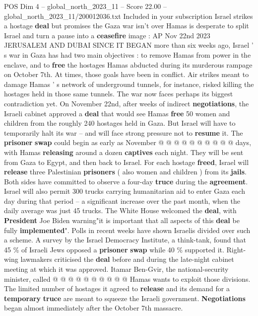 \begin{textsample}{POS Dim 4 – global\_north\_2023\_11 – Score 22.00 – global\_north\_2023\_11/200012036.txt}  \label{ex:f4_pos_272}
Included in your subscription Israel strikes a hostage \textbf{deal} but promises the Gaza war isn't over Hamas is desperate to split Israel and turn a pause into a \textbf{ceasefire} image : AP Nov 22nd 2023 JERUSALEM AND DUBAI SINCE IT BEGAN more than six weeks ago, Israel ' s war in Gaza has had two main objectives : to remove Hamas from power in the enclave, and to \textbf{free} the hostages Hamas abducted during its murderous rampage on October 7th.
At times, those goals have been in conflict.
Air strikes meant to damage Hamas ' s network of underground tunnels, for instance, risked killing the hostages held in those same tunnels.
The war now faces perhaps its biggest contradiction yet.
On November 22nd, after weeks of indirect \textbf{negotiations}, the Israeli cabinet approved a \textbf{deal} that would see Hamas \textbf{free} 50 women and children from the roughly 240 hostages held in Gaza.
But Israel will have to temporarily halt its war -- and will face strong pressure not to \textbf{resume} it.
The \textbf{prisoner} \textbf{swap} could begin as early as November @ @ @ @ @ @ @ @ @ @ days, with Hamas \textbf{releasing} around a dozen \textbf{captives} each night.
They will be sent from Gaza to Egypt, and then back to Israel.
For each hostage \textbf{freed}, Israel will \textbf{release} three Palestinian \textbf{prisoners} ( also women and children ) from its \textbf{jails}.
Both sides have committed to observe a four-day \textbf{truce} during the \textbf{agreement}.
Israel will also permit 300 trucks carrying humanitarian aid to enter Gaza each day during that period -- a significant increase over the past month, when the daily average was just 45 trucks.
The White House welcomed the \textbf{deal}, with \textbf{President} Joe Biden warning"it is important that all aspects of this \textbf{deal} be fully \textbf{implemented}".
Polls in recent weeks have shown Israelis divided over such a scheme.
A survey by the Israel Democracy Institute, a think-tank, found that 45 \% of Israeli Jews opposed a \textbf{prisoner} \textbf{swap} while 40 \% supported it.
Right-wing lawmakers criticised the \textbf{deal} before and during the late-night cabinet meeting at which it was approved.
Itamar Ben-Gvir, the national-security minister, called @ @ @ @ @ @ @ @ @ @ Hamas wants to exploit those divisions.
The limited number of hostages it agreed to \textbf{release} and its demand for a \textbf{temporary} \textbf{truce} are meant to squeeze the Israeli government. \textbf{Negotiations} began almost immediately after the October 7th massacre.

\end{textsample}
